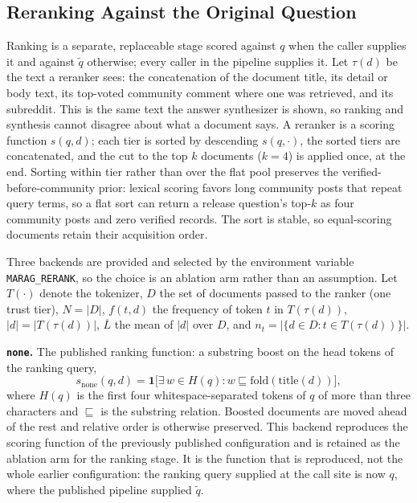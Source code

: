 \subsection{Reranking Against the Original Question}\label{sec:rerank}

Ranking is a separate, replaceable stage scored against $q$ when the
caller supplies it and against $\tilde{q}$ otherwise; every caller in
the pipeline supplies it. Let
$\tau(d)$ be the text a reranker sees: the concatenation of the
document title, its detail or body text, its top-voted community
comment where one was retrieved, and its subreddit. This is the same
text the answer synthesizer is shown, so ranking and synthesis cannot
disagree about what a document says. A reranker is a scoring function
$s(q, d)$; each tier is sorted by descending $s(q, \cdot)$, the sorted
tiers are concatenated, and the cut to the top $k$ documents ($k = 4$)
is applied once, at the end. Sorting within tier rather than over the
flat pool preserves the verified-before-community prior: lexical
scoring favors long community posts that repeat query terms, so a flat
sort can return a release question's top-$k$ as four community posts
and zero verified records. The sort is stable, so equal-scoring
documents retain their acquisition order.

Three backends are provided and selected by the environment variable
\texttt{MARAG\_RERANK}, so the choice is an ablation arm rather than an
assumption. Let $T(\cdot)$ denote the tokenizer, $D$ the set of
documents passed to the ranker (one trust tier), $N = |D|$,
$f(t,d)$ the frequency of token $t$ in $T(\tau(d))$,
$|d| = |T(\tau(d))|$, $\overline{L}$ the mean of $|d|$ over $D$, and
$n_t = |\{d \in D : t \in T(\tau(d))\}|$.

\textbf{\texttt{none}.} The published ranking function: a substring
boost on the head tokens of the ranking query,
\begin{equation}
s_{\mathrm{none}}(q, d) = \mathbf{1}\big[\exists\, w \in H(q) : w \sqsubseteq \mathrm{fold}(\mathrm{title}(d))\big],
\label{eq:none}
\end{equation}
where $H(q)$ is the first four whitespace-separated tokens of $q$ of
more than three characters and $\sqsubseteq$ is the substring
relation. Boosted documents are moved ahead of the rest and relative
order is otherwise preserved. This backend reproduces the scoring
function of the previously published configuration and is retained as
the ablation arm for the ranking stage. It is the function that is
reproduced, not the whole earlier configuration: the ranking query
supplied at the call site is now $q$, where the published pipeline
supplied $\tilde{q}$.

